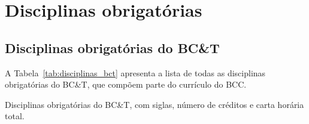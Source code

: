 \section{Disciplinas obrigatórias}
\label{sec:disciplinas_obrigatorias}

\subsection{Disciplinas obrigatórias do BC\&T}

A Tabela~\ref{tab:disciplinas_bct} apresenta a lista de todas as
disciplinas obrigatórias do BC\&T, que compõem parte do currículo do BCC.

\begin{table}[h!]
    \caption{Disciplinas obrigatórias do BC\&T, com siglas, número de créditos e carta horária total.}
    \label{tab:disciplinas_bct}


\end{table}

